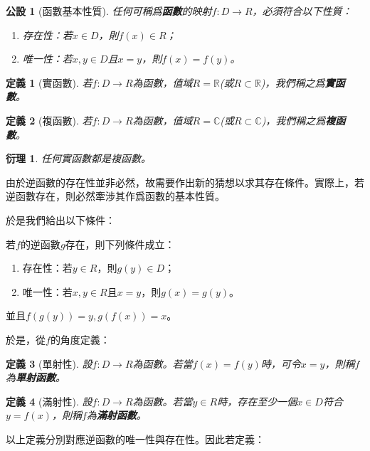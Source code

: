 \documentclass[12pt]{article}
\newtheorem{definition}{定義}
\newtheorem*{corollary}{衍理}
\newtheorem*{axiom}{公設}
\begin{document}
    \begin{axiom}[函數基本性質]
        任何可稱爲\textbf{函數}的映射$f:D\to R$，必須符合以下性質：\begin{enumerate}
            \item 存在性：若$x\in D$，則$f(x)\in R$；
            \item 唯一性：若$x,y\in D$且$x=y$，則$f(x)=f(y)$。
        \end{enumerate}
    \end{axiom}

    \begin{definition}[實函數]
        若$f:D\to R$為函數，值域$R=\mathbb{R}$(或$R\subset \mathbb{R}$)，我們稱之爲\textbf{實函數}。
    \end{definition}

    \begin{definition}[複函數]
        若$f:D\to R$為函數，值域$R=\mathbb{C}$(或$R\subset \mathbb{C}$)，我們稱之爲\textbf{複函數}。
    \end{definition}

    \begin{corollary}
        任何實函數都是複函數。
    \end{corollary}

    由於逆函數的存在性並非必然，故需要作出新的猜想以求其存在條件。實際上，若逆函數存在，則必然牽涉其作爲函數的基本性質。

    於是我們給出以下條件：

    若$f$的逆函數$g$存在，則下列條件成立：\begin{enumerate}
        \item 存在性：若$y\in R$，則$g(y)\in D$；
        \item 唯一性：若$x,y\in R$且$x=y$，則$g(x)=g(y)$。
    \end{enumerate}
    並且$f(g(y))=y,g(f(x))=x$。

    於是，從$f$的角度定義：

    \begin{definition}[單射性]
        設$f:D\to R$為函數。若當$f(x)=f(y)$時，可令$x=y$，則稱$f$為\textbf{單射函數}。
    \end{definition}
    
    \begin{definition}[滿射性]
        設$f:D\to R$為函數。若當$y\in R$時，存在至少一個$x\in D$符合$y=f(x)$，則稱$f$為\textbf{滿射函數}。
    \end{definition}

    以上定義分別對應逆函數的唯一性與存在性。因此若定義：
\end{document}
